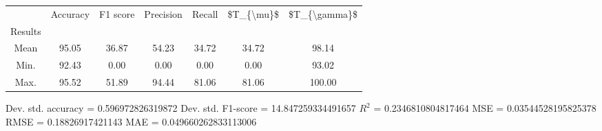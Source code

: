 \begin{tabular}{|c|c|c|c|c|c|c|}
\toprule
{} &  Accuracy &  F1 score &  Precision &  Recall &  \$T\_\{\textbackslash mu\}\$ &  \$T\_\{\textbackslash gamma\}\$ \\
Results &           &           &            &         &            &               \\
\hline
Mean    &     95.05 &     36.87 &      54.23 &   34.72 &      34.72 &         98.14 \\
Min.    &     92.43 &      0.00 &       0.00 &    0.00 &       0.00 &         93.02 \\
Max.    &     95.52 &     51.89 &      94.44 &   81.06 &      81.06 &        100.00 \\
\bottomrule
\end{tabular}

 Dev. std. accuracy = 0.596972826319872
 Dev. std. F1-score = 14.847259334491657
 $R^2$ = 0.2346810804817464
 MSE = 0.03544528195825378
 RMSE = 0.18826917421143
 MAE = 0.049660262833113006
